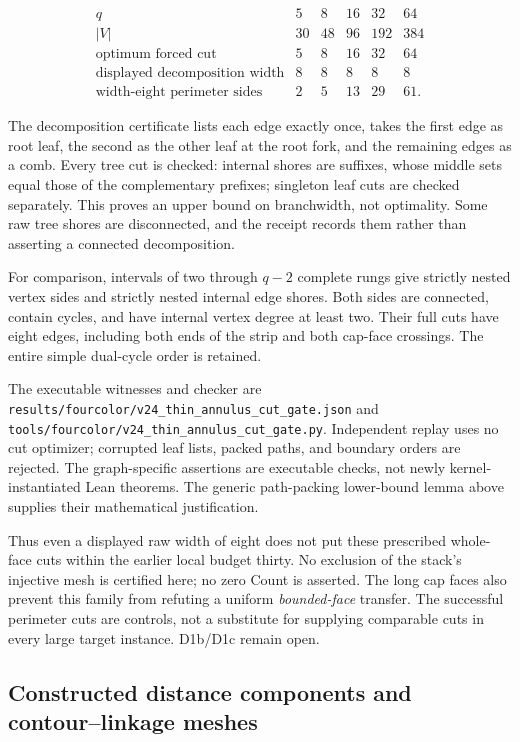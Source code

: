 \[
\begin{array}{c|rrrrr}
q&5&8&16&32&64\\ \hline
|V|&30&48&96&192&384\\
\text{optimum forced cut}&5&8&16&32&64\\
\text{displayed decomposition width}&8&8&8&8&8\\
\text{width-eight perimeter sides}&2&5&13&29&61.
\end{array}
\]

The decomposition certificate lists each edge exactly once, takes the first
edge as root leaf, the second as the other leaf at the root fork, and the
remaining edges as a comb.  Every tree cut is checked: internal shores are
suffixes, whose middle sets equal those of the complementary prefixes;
singleton leaf cuts are checked separately.  This proves an upper bound on
branchwidth, not optimality.  Some raw tree shores are disconnected, and
the receipt records them rather than asserting a connected decomposition.

For comparison, intervals of two through $q-2$ complete rungs give strictly
nested vertex sides and strictly nested internal edge shores.  Both sides
are connected, contain cycles, and have internal vertex degree at least two.
Their full cuts have eight edges, including both ends of the strip and both
cap-face crossings.  The entire simple dual-cycle order is retained.

The executable witnesses and checker are
\texttt{results/fourcolor/v24\_thin\_annulus\_cut\_gate.json} and
\texttt{tools/fourcolor/v24\_thin\_annulus\_cut\_gate.py}.  Independent replay
uses no cut optimizer; corrupted leaf lists, packed paths, and boundary
orders are rejected.  The graph-specific assertions are executable checks,
not newly kernel-instantiated Lean theorems.  The generic path-packing
lower-bound lemma above supplies their mathematical justification.

Thus even a displayed raw width of eight does not put these prescribed
whole-face cuts within the earlier local budget thirty.  No exclusion of the
stack's injective mesh is certified here; no zero Count is asserted.  The
long cap faces also prevent this family from refuting a uniform
\emph{bounded-face} transfer.  The successful perimeter cuts are controls,
not a substitute for supplying comparable cuts in every large target
instance.  D1b/D1c remain open.

\subsection{Constructed distance components and contour--linkage meshes}
\label{sec:contour-linkage-mesh-extraction}

